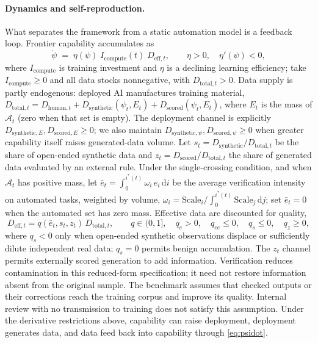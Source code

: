 \documentclass[12pt]{article}
\theoremstyle{plain}
\theoremstyle{definition}
\theoremstyle{remark}
\begin{document}
\paragraph{Dynamics and self-reproduction.}
What separates the framework from a static automation model is a feedback
loop. Frontier capability accumulates as
\begin{equation}\label{eq:psidot}
\dot{\psi} \;=\; \eta(\psi)\; I_{\mathrm{compute}}(t)\; D_{\mathrm{eff},t},
\qquad \eta > 0,\quad \eta'(\psi) < 0,
\end{equation}
where $I_{\mathrm{compute}}$ is training investment and $\eta$ is a
declining learning efficiency; take $I_{\mathrm{compute}}\ge0$ and all
data stocks nonnegative, with $D_{\mathrm{total},t}>0$. Data supply is partly endogenous:
deployed AI manufactures training material,
$D_{\mathrm{total},t} = D_{\mathrm{human},t} +
D_{\mathrm{synthetic}}(\psi_t,E_t)+
D_{\mathrm{scored}}(\psi_t,E_t)$, where $E_t$ is the mass of
$\mathcal A_t$ (zero when that set is empty). The deployment channel is
explicitly
$D_{\mathrm{synthetic},E},D_{\mathrm{scored},E}\ge0$; we also maintain
$D_{\mathrm{synthetic},\psi},D_{\mathrm{scored},\psi}\ge0$ when greater
capability itself raises generated-data volume. Let
$s_t=D_{\mathrm{synthetic}}/D_{\mathrm{total},t}$ be the share of
open-ended synthetic data and
$z_t=D_{\mathrm{scored}}/D_{\mathrm{total},t}$ the share of generated
data evaluated by an external rule. Under the single-crossing condition, and when $\mathcal A_t$ has
positive mass, let
$\bar{e}_t = \int_0^{i^{*}(t)} \omega_i\, e_i\,\mathrm{d}i$ be the
average verification intensity on automated tasks, weighted by volume,
$\omega_i = \mathrm{Scale}_i \big/ \int_0^{i^{*}(t)}
\mathrm{Scale}_j\,\mathrm{d}j$; set $\bar e_t=0$ when the automated set has zero mass.
Effective data are discounted for
quality,
\begin{equation}\label{eq:quality}
D_{\mathrm{eff},t} = q(\bar{e}_t,s_t,z_t)\,D_{\mathrm{total},t},
\qquad q\in(0,1],\quad q_e>0,\quad q_{ee}\le0,\quad q_s\le0,\quad q_z\ge0,
\end{equation}
where $q_s<0$ only when open-ended synthetic observations displace or
sufficiently dilute independent real data; $q_s=0$ permits benign
accumulation. The $z_t$ channel permits externally scored generation to
add information. Verification reduces contamination in this reduced-form specification;
it need not restore information absent from the original sample. The
benchmark assumes that checked outputs or their corrections reach the
training corpus and improve its quality. Internal review with no
transmission to training does not satisfy this assumption. Under the derivative restrictions above, capability can
raise deployment, deployment generates data, and data feed back into
capability through \eqref{eq:psidot}.
\end{document}
